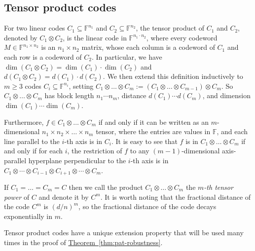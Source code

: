 \documentclass[11pt]{article}
\numberwithin{equation}{section}
\theoremstyle{definition}
\theoremstyle{plain}
\newcommand{\expref}[2]{\hyperref[#2]{#1~\ref{#2}}}
\theoremstyle{plain}
\newcommand{\colored}{}
\newcommand{\codedist}{\colored{d}} %
\newcommand{\blocklength}{\colored{n}} %
\newcommand{\testerinput}{\colored{M}} %
\newcommand{\closestglobalword}{\colored{f}} %
\newcommand{\Field}{\colored{\mathbb F}}
\begin{document}
\subsection{Tensor product codes}
\label{sec:tensor-product-codes}

%
%
%

For two linear codes
$C_1 \subseteq \Field^{\blocklength_1}$ and
$C_2 \subseteq \Field^{\blocklength_2}$,
the tensor product of $C_1$ and $C_2$, denoted by $C_1 \otimes C_2$,
is the linear code in
$\Field^{\blocklength_1\cdot\blocklength_2}$,
where every codeword
$\testerinput \in \Field^{\blocklength_1 \times \blocklength_2}$
is an $\blocklength_1 \times \blocklength_2$ matrix, whose each column
is a codeword of $C_1$ and each row is a codeword of $C_2$.
In particular, we have $\dim(C_1\otimes C_2)=\dim(C_1)\cdot\dim(C_2)$
and $\codedist(C_1\otimes C_2) = \codedist(C_1) \cdot \codedist(C_2)$.
%
%
%
%
We then extend this definition inductively to $m\ge 3$ codes
$C_i \subseteq \Field^{\blocklength_i}$, setting
$C_1\otimes\dots\otimes C_m:=
(C_1\otimes\dots\otimes C_{m-1})\otimes C_m$.  
So $C_1\otimes\dots\otimes C_m$ has
block length $\blocklength_1\cdots \blocklength_m$,
distance $\codedist(C_1)\cdots \codedist(C_m)$, and
dimension $\dim(C_1)\cdots\dim(C_m)$.

Furthermore, $\closestglobalword \in C_1\otimes\dots\otimes C_m$
if and only if it can be written as an $m$-dimensional 
$\blocklength_1 \times \blocklength_2 \times \dots \times \blocklength_m$
tensor, where the entries are values in $\Field$, and each line parallel
to the $i$-th axis is in $C_i$. It is easy to see that
$\closestglobalword$ is in $C_1\otimes\dots\otimes C_m$
if and only if for each $i$, the restriction of $\closestglobalword$ to
any $(m-1)$-dimensional axis-parallel hyperplane perpendicular to
the $i$-th axis is in
$C_1\otimes\cdots\otimes C_{i-1}\otimes C_{i+1}\otimes\cdots\otimes C_m$.

If $C_1=\dots=C_m=C$ then we call the
product $C_1\otimes\dots\otimes C_m$ the
\emph{$m$-th tensor power} of $C$ and denote it by $C^m$.
It is worth noting that the fractional distance of the code
$C^m$ is $(\codedist/\blocklength)^m$, so the fractional distance
of the code decays exponentially in $m$.
%

%
%
%
%
%
%
%
%
%
%
%
%
%
%
%
%
%
%
%
%
%
%
%
%
%
%
%
%
%
%

Tensor product codes have a unique extension property that will be used many times in the proof of \expref{Theorem}{thm:pat-robustness}.
\end{document}
